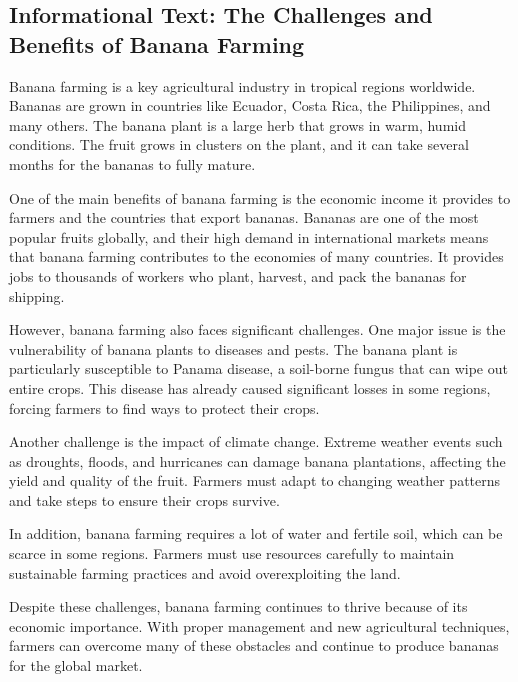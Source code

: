 \documentclass[12pt]{article}
\begin{document}
\onehalfspacing

\subsection*{Informational Text: The Challenges and Benefits of Banana Farming}

\begin{tcolorbox}[colframe=black!40, colback=gray!5]

\begin{spacing}{1.15}

Banana farming is a key agricultural industry in tropical regions worldwide. Bananas are grown in countries like Ecuador, Costa Rica, the Philippines, and many others. The banana plant is a large herb that grows in warm, humid conditions. The fruit grows in clusters on the plant, and it can take several months for the bananas to fully mature.

One of the main benefits of banana farming is the economic income it provides to farmers and the countries that export bananas. Bananas are one of the most popular fruits globally, and their high demand in international markets means that banana farming contributes to the economies of many countries. It provides jobs to thousands of workers who plant, harvest, and pack the bananas for shipping.

However, banana farming also faces significant challenges. One major issue is the vulnerability of banana plants to diseases and pests. The banana plant is particularly susceptible to Panama disease, a soil-borne fungus that can wipe out entire crops. This disease has already caused significant losses in some regions, forcing farmers to find ways to protect their crops.

Another challenge is the impact of climate change. Extreme weather events such as droughts, floods, and hurricanes can damage banana plantations, affecting the yield and quality of the fruit. Farmers must adapt to changing weather patterns and take steps to ensure their crops survive.

In addition, banana farming requires a lot of water and fertile soil, which can be scarce in some regions. Farmers must use resources carefully to maintain sustainable farming practices and avoid overexploiting the land.

Despite these challenges, banana farming continues to thrive because of its economic importance. With proper management and new agricultural techniques, farmers can overcome many of these obstacles and continue to produce bananas for the global market.

\end{spacing}

\end{tcolorbox}
\end{document}
